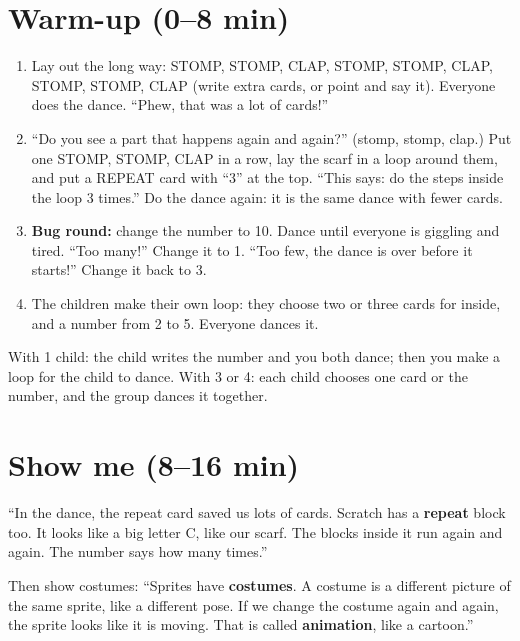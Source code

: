 \section{Warm-up (0--8 min)}
\begin{unplugged}
\begin{enumerate}[leftmargin=1.4em,itemsep=1pt]
  \item Lay out the long way: STOMP, STOMP, CLAP, STOMP, STOMP, CLAP, STOMP, STOMP, CLAP (write extra cards, or point and say it). Everyone does the dance. \enquote{Phew, that was a lot of cards!}
  \item \enquote{Do you see a part that happens again and again?} (stomp, stomp, clap.) Put one STOMP, STOMP, CLAP in a row, lay the scarf in a loop around them, and put a REPEAT card with \enquote{3} at the top. \enquote{This says: do the steps inside the loop 3 times.} Do the dance again: it is the same dance with fewer cards.
  \item \textbf{Bug round:} change the number to 10. Dance until everyone is giggling and tired. \enquote{Too many!} Change it to 1. \enquote{Too few, the dance is over before it starts!} Change it back to 3.
  \item The children make their own loop: they choose two or three cards for inside, and a number from 2 to 5. Everyone dances it.
\end{enumerate}
With 1 child: the child writes the number and you both dance; then you make a loop for the child to dance. With 3 or 4: each child chooses one card or the number, and the group dances it together.
\end{unplugged}

\section{Show me (8--16 min)}
\begin{teacherscript}
\enquote{In the dance, the repeat card saved us lots of cards. Scratch has a \textbf{repeat} block too. It looks like a big letter C, like our scarf. The blocks inside it run again and again. The number says how many times.}

Then show costumes: \enquote{Sprites have \textbf{costumes}. A costume is a different picture of the same sprite, like a different pose. If we change the costume again and again, the sprite looks like it is moving. That is called \textbf{animation}, like a cartoon.}
\end{teacherscript}

